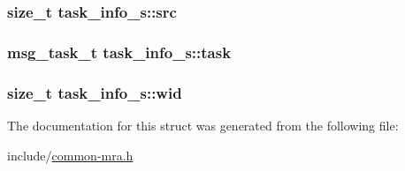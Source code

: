 \hypertarget{structtask__info__s_a80e71f08fc31bfe88a8c546f0e8155d7}{
\subsubsection[{src}]{\setlength{\rightskip}{0pt plus 5cm}size\-\_\-t {\bf task\-\_\-info\-\_\-s\-::src}}}\label{structtask__info__s_a80e71f08fc31bfe88a8c546f0e8155d7}
\hypertarget{structtask__info__s_a852100955a5ed323f31c670ef596787c}{
\subsubsection[{task}]{\setlength{\rightskip}{0pt plus 5cm}msg\-\_\-task\-\_\-t {\bf task\-\_\-info\-\_\-s\-::task}}}\label{structtask__info__s_a852100955a5ed323f31c670ef596787c}
\hypertarget{structtask__info__s_a7b70c65e767769e2a42e6c5978c2c669}{
\subsubsection[{wid}]{\setlength{\rightskip}{0pt plus 5cm}size\-\_\-t {\bf task\-\_\-info\-\_\-s\-::wid}}}\label{structtask__info__s_a7b70c65e767769e2a42e6c5978c2c669}


\-The documentation for this struct was generated from the following file\-:\begin{DoxyCompactItemize}
\item 
include/\hyperlink{common-mra_8h}{common-\/mra.\-h}\end{DoxyCompactItemize}
